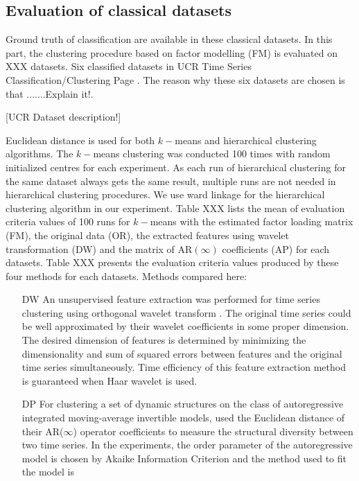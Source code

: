 \documentclass{statsoc}
\begin{document}
\subsection{Evaluation of classical datasets}
Ground truth of classification are available in these classical datasets. In this part, the clustering procedure based on factor modelling (FM) is evaluated on XXX datasets. Six classified datasets in UCR Time Series Classification/Clustering Page \citep{UCR}. The reason why these six datasets are chosen is that {\sf .......Explain it!}. 
\begin{center}
[\sf UCR Dataset description!]
\end{center}
Euclidean distance is used for both $k-$means and hierarchical clustering algorithms. The $k-$means clustering was conducted 100 times with random initialized centres for each experiment. As each run of hierarchical clustering for the same dataset always gets the same result, multiple runs are not needed in hierarchical clustering procedures. We use ward linkage \citep{ward} for the hierarchical clustering algorithm in our experiment. Table XXX lists the mean of evaluation criteria values of 100 runs for $k-$means with the estimated factor loading matrix (FM), the original data (OR), the extracted features using wavelet transformation (DW) and the matrix of AR$(\infty)$ coefficients (AP) for each datasets. Table XXX presents the evaluation criteria values produced by these four methods for each datasets. {\sf Methods compared here:}
\begin{itemize} 
\item[DW] An unsupervised feature extraction was performed for time series clustering using orthogonal wavelet transform \citep{wt_05}. The original time series could be well approximated by their wavelet coefficients in some proper dimension. The desired dimension of features is determined by minimizing the dimensionality and sum of squared errors between features and the original time series simultaneously. Time efficiency of this feature extraction method is guaranteed when Haar wavelet is used.
\item[DP] For clustering a set of dynamic structures on the class of autoregressive integrated moving-average invertible models, \citet{dp_90} used the Euclidean distance of their AR($\infty$) operator coefficients to measure the structural diversity between two time series. In the experiments, the order parameter of the autoregressive model is chosen by Akaike Information Criterion and the method used to fit the model is 
\end{itemize}

\end{document}
